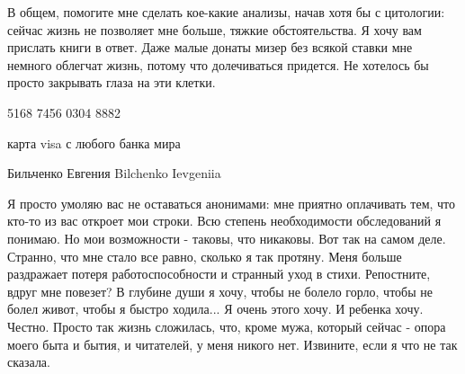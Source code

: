 В общем, помогите мне сделать кое-какие анализы, начав хотя бы с цитологии:
сейчас жизнь не позволяет мне больше, тяжкие обстоятельства. Я хочу вам
прислать книги в ответ. Даже малые донаты мизер без всякой ставки мне немного
облегчат жизнь, потому что долечиваться придется. Не хотелось бы просто
закрывать глаза на эти клетки. 

5168 7456 0304 8882 

карта visa с любого банка мира

Бильченко Евгения Bilchenko Ievgeniia

Я просто умоляю вас не оставаться анонимами: мне приятно оплачивать тем, что
кто-то из вас откроет мои строки. Всю степень необходимости обследований я
понимаю. Но мои возможности - таковы, что никаковы. Вот так на самом деле.
Странно, что мне стало все равно, сколько я так протяну. Меня больше раздражает
потеря работоспособности и странный уход в стихи. Репостните, вдруг мне
повезет? В глубине души я хочу, чтобы не болело горло, чтобы не болел живот,
чтобы я быстро ходила... Я очень этого хочу. И ребенка хочу. Честно. Просто так
жизнь сложилась, что, кроме мужа, который сейчас - опора моего быта и бытия, и
читателей, у меня никого нет. Извините, если я что не так сказала.


